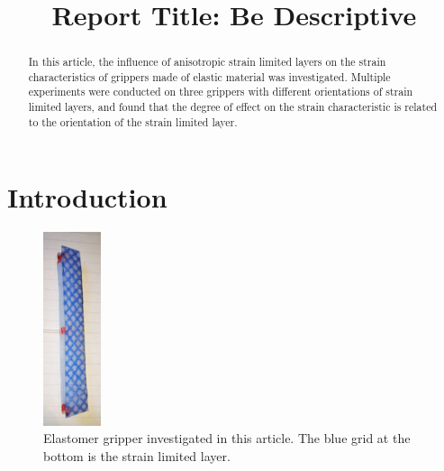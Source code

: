 \documentclass[conference]{IEEEtran}
\begin{document}
\title{Report Title: Be Descriptive}

\author{
    \and
}

\maketitle

\begin{abstract}
In this article, the influence of anisotropic strain limited layers on the strain characteristics of grippers made of elastic material was investigated. Multiple experiments were conducted on three grippers with different orientations of strain limited layers, and found that the degree of effect on the strain characteristic is related to the orientation of the strain limited layer.
\end{abstract}

% 

\section{Introduction}


\begin{figure}
  \label{fig:Elastomer}
  \centering
  \includegraphics[width=0.15\textwidth]{pics/弹性体示意图.png}
  \caption{Elastomer gripper investigated in this article. The blue grid at the bottom is the strain limited layer.}
\end{figure}
\end{document}
